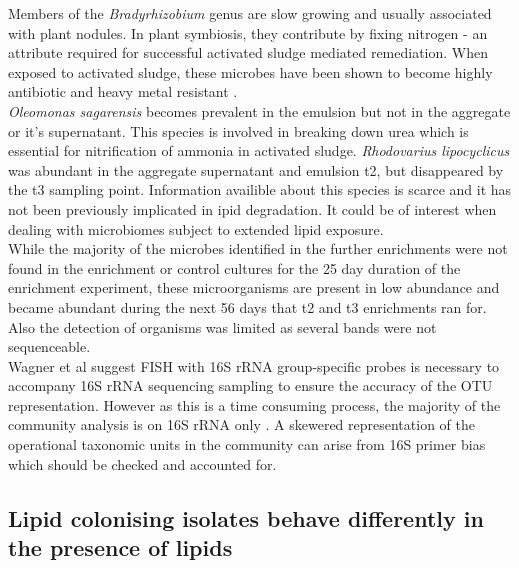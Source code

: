 \documentclass[twoside]{article}
\begin{document}
Members of the \emph{Bradyrhizobium} genus are slow growing \cite{rebah2002wastewater} and usually associated with plant nodules. In plant symbiosis, they contribute by fixing nitrogen - an attribute required for successful activated sludge mediated remediation. When exposed to activated sludge, these microbes have been shown to become highly antibiotic and heavy metal resistant \cite{ahmad17samiullah}.\\


\emph{Oleomonas sagarensis} becomes prevalent in the emulsion but not in the aggregate or it's supernatant. This species is involved in breaking down urea \cite{kanamori2005allophanate,kanamori2004enzymatic} which is essential for nitrification of ammonia in activated sludge.
\emph{Rhodovarius lipocyclicus} was abundant in the aggregate supernatant and emulsion t2, but disappeared by the t3 sampling point. Information availible about this species is scarce \cite{kampfer2004rhodovarius} and it has not been previously implicated in ipid degradation. It could be of interest when dealing with microbiomes subject to extended lipid exposure. \\

While the majority of the microbes identified in the further enrichments were not found in the enrichment or control cultures for the 25 day duration of the enrichment experiment, these microorganisms are present in low abundance and became abundant during the next 56 days that t2 and t3 enrichments ran for. Also the detection of organisms was limited as several bands were not sequenceable.\\




Wagner et al suggest FISH with 16S rRNA group-specific probes is necessary to accompany 16S rRNA sequencing sampling to ensure the accuracy of the OTU representation. However as this is a time consuming process, the majority of the community analysis is on 16S rRNA only \cite{Wagner_02} . A skewered representation of the operational taxonomic units in the community can arise from 16S primer bias which should be checked and accounted for.


\subsection{Lipid colonising isolates behave differently in the presence of lipids}
\end{document}
